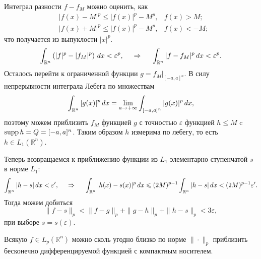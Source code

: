 \begin{uproof}
    Интеграл разности $f - f_M$ можно оценить, как
    \begin{align*}
        &|f(x) -M|^p \leq |f(x)|^p - M^p, &f(x) > M; \\
        &|f(x) +M|^p \leq |f(x)|^p - M^p, &f(x) <- M;
    \end{align*}
    что получается из выпуклости $|x|^p$. 
    \begin{equation*}
        \int_{\mathbb{R}^n} \left(|f|^p - |f_M|^p\right) \, d x < \varepsilon^p,
        \hspace{0.5cm} \Rightarrow \hspace{0.5cm}
        \int_{\mathbb{R}^n} |f - f_M|^p \, d x < \varepsilon^p.
    \end{equation*}
    Осталось перейти к ограниченной функции $g = f_M |_{[-a, a]^n}$. В силу непрерывности интеграла Лебега по множествам
    \begin{equation*}
        \int_{\mathbb{R}^n} |g(x)|^p \, d x = \lim_{a \to + \infty} \int_{[-a, a]^n} |g(x)|^p \, d x,
    \end{equation*}
    поэтому можем приблизить $f_M$ функцией $g$ с точностью $\varepsilon$ функцией $h \leq M$ c $\mathop{\mathrm{supp}}\nolimits h = Q = [-a, a]^n$. Таким образом $h$ измерима по лебегу, то есть $h \in L_1 \left(\mathbb{R}^n\right)$. 

    Теперь возвращаемся к приближению функции из $L_1$ элементарно ступенчатой $s$ в норме $L_1$:
    \begin{equation*}
        \int_{\mathbb{R}^n} |h-s| \, d x < \varepsilon',
        \hspace{0.5cm} \Rightarrow \hspace{0.5cm}
        \int_{\mathbb{R}^n} |h(x) - s(x)|^p \, d x \leqslant (2M)^{p-1} \int_{\mathbb{R}^n} |h-s| \, d x < (2M)^{p-1} \varepsilon'.
    \end{equation*}
    Тогда можем добиться 
    \begin{equation*}
        \|f-s\|_p < \|f - g\|_p + \|g-h\|_p + \|h-s\|_p <3 \varepsilon,
    \end{equation*}
    при выборе $s = s(\varepsilon)$.
\end{uproof}



\begin{to_thr}
    Всякую $f \in L_p (\mathbb{R}^n)$ можно сколь угодно близко по норме $\| \cdot \|_p$ приблизить бесконечно дифференцируемой функцией с компактным носителем.
    \label{thr8d17}
\end{to_thr}



